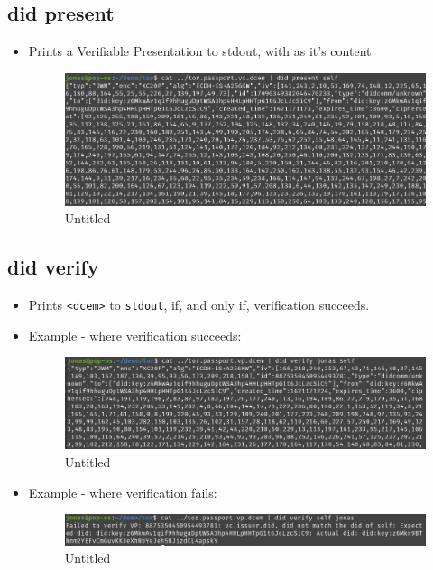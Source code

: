 \hypertarget{did-present}{%
\subsection{\texorpdfstring{did present
}{did present  }}\label{did-present}}

\begin{itemize}
\item
  Prints a Verifiable Presentation to stdout, with as it's content

  \begin{figure}
  \centering
  \includegraphics{User Interface f8759a9462b24d5f95cf6123d68b89ea/Untitled 12.png}
  \caption{Untitled}
  \end{figure}
\end{itemize}

\hypertarget{did-verify}{%
\subsection{\texorpdfstring{did verify
}{did verify   }}\label{did-verify}}

\begin{itemize}
\item
  Prints \lstinline!<dcem>! to
  \lstinline!stdout!, if, and only if, verification
  succeeds.
\item
  Example - where verification succeeds:

  \begin{figure}
  \centering
  \includegraphics{User Interface f8759a9462b24d5f95cf6123d68b89ea/Untitled 13.png}
  \caption{Untitled}
  \end{figure}
\item
  Example - where verification fails:

  \begin{figure}
  \centering
  \includegraphics{User Interface f8759a9462b24d5f95cf6123d68b89ea/Untitled 14.png}
  \caption{Untitled}
  \end{figure}
\end{itemize}

